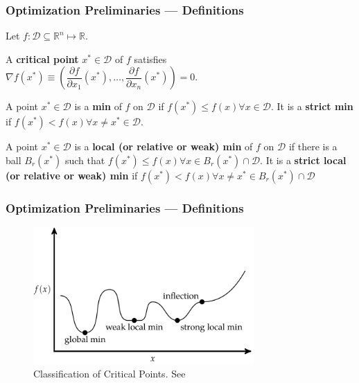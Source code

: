 \documentclass[11pt,xcolor={svgnames},aspectratio=169,usepdftitle=false,notheorems]{beamer}
\begin{document}
\begin{frame}
  \frametitle{Optimization Preliminaries --- Definitions}
Let $f : \mathcal{D}\subseteq\mathbb{R}^n \mapsto \mathbb{R}$. 

\begin{definition}
A \alert{\textbf{critical point}} $x^*\in\mathcal{D}$ of $f$ satisfies $\nabla f(x^*) \equiv \left(\dfrac{\partial f}{\partial x_1}(x^*), \ldots,\dfrac{\partial f}{\partial x_n}(x^*)\right) = 0$.
\end{definition}

\begin{definition}
A point $x^*\in\mathcal{D}$ is a \alert{\textbf{min}} of $f$ on $\mathcal{D}$ if $f(x^*)\leq f(x) \forall x\in\mathcal{D}$. It is a \alert{\textbf{strict min}} if $f(x^*) < f(x) \forall x\neq x^*\in\mathcal{D}$.
\end{definition}

\begin{definition}
A point $x^*\in\mathcal{D}$ is a \alert{\textbf{local (or relative or weak) min}} of $f$ on $\mathcal{D}$ if there is a ball $B_r(x^*)$ such that $f(x^*) \leq f(x) \forall x\in B_r(x^*)\cap\mathcal{D}$. It is a \alert{\textbf{strict local (or relative or weak) min}} if $f(x^*) < f(x) \forall x\neq x^*\in B_r(x^*)\cap\mathcal{D}$
\end{definition}
\end{frame}

\begin{frame}
  \frametitle{Optimization Preliminaries --- Definitions}
\begin{figure}
  \centering
    \includegraphics[width = 0.75\textwidth]{../figures/classification_critical_points.png}
    \caption{Classification of Critical Points. See \cite{kochenderfer2019optimization}}
\end{figure}
\end{frame}
\end{document}
